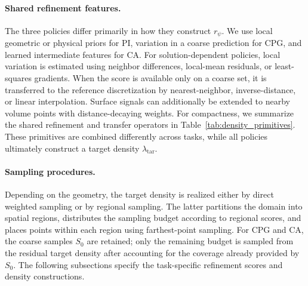 \documentclass{article}
\providecommand{\DIFdelend}{} %
\DeclareRobustCommand{\DIFdelend}{\DIFOaddend \let\includegraphics\DIFOincludegraphics} %
\begin{document}
\DIFdelend \paragraph{Shared refinement features.}
The three policies differ primarily in how they construct $r_\psi$.
We use local geometric or physical priors for PI, variation in a coarse
prediction for CPG, and learned intermediate features for CA.
For solution-dependent policies, local variation is estimated using
neighbor differences, local-mean residuals, or least-squares gradients.
When the score is available only on a coarse set, it is transferred to the
reference discretization by nearest-neighbor, inverse-distance, or linear
interpolation. Surface signals can additionally be extended to nearby volume
points with distance-decaying weights.  For compactness, we summarize the shared refinement and transfer operators in Table~\ref{tab:density_primitives}. These primitives are combined differently across tasks, while all policies ultimately construct a target density \(\lambda_{\mathrm{tar}}\).

\paragraph{Sampling procedures.}
Depending on the geometry, the target density is realized either by direct
weighted sampling or by regional sampling. The latter partitions the domain
into spatial regions, distributes the sampling budget according to regional
scores, and places points within each region using farthest-point sampling.
For CPG and CA, the coarse samples $S_0$ are retained; only the remaining
budget is sampled from the residual target density after accounting for the
coverage already provided by $S_0$. The following subsections specify the
task-specific refinement scores and density constructions.
\end{document}
